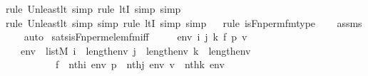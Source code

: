 \begin{isabellebody}
{\isacharparenleft}{\kern0pt}rule\ Un{\isacharunderscore}{\kern0pt}least{\isacharunderscore}{\kern0pt}lt{\isacharcomma}{\kern0pt}\ simp{\isacharcomma}{\kern0pt}\ rule\ ltI{\isacharcomma}{\kern0pt}\ simp{\isacharcomma}{\kern0pt}\ simp{\isacharparenright}{\kern0pt}\isanewline
\ \ \ \isamarkupfalse%
{\isacharparenleft}{\kern0pt}rule\ Un{\isacharunderscore}{\kern0pt}least{\isacharunderscore}{\kern0pt}lt{\isacharcomma}{\kern0pt}\ simp{\isacharcomma}{\kern0pt}\ simp{\isacharcomma}{\kern0pt}\ rule\ ltI{\isacharcomma}{\kern0pt}\ simp{\isacharcomma}{\kern0pt}\ simp{\isacharparenright}{\kern0pt}\isanewline
\ \ \isamarkupfalse%
{\isacharparenleft}{\kern0pt}rule\ is{\isacharunderscore}{\kern0pt}Fn{\isacharunderscore}{\kern0pt}perm{\isacharunderscore}{\kern0pt}fm{\isacharunderscore}{\kern0pt}type{\isacharparenright}{\kern0pt}\isanewline
\ \ \isamarkupfalse%
\ assms\isanewline
\ \ \isamarkupfalse%
\ auto%
\endisatagproof
{\isafoldproof}%
%
\isadelimproof
\isanewline
%
\endisadelimproof
\isanewline
{}\isamarkupfalse%
\ sats{\isacharunderscore}{\kern0pt}is{\isacharunderscore}{\kern0pt}Fn{\isacharunderscore}{\kern0pt}perm{\isacharprime}{\kern0pt}{\isacharunderscore}{\kern0pt}elem{\isacharunderscore}{\kern0pt}fm{\isacharunderscore}{\kern0pt}iff\ {\isacharcolon}{\kern0pt}\ \isanewline
\ \ \ env\ i\ j\ k\ f\ p\ v\ \isanewline
\ \ \ {\isachardoublequoteopen}env\ {\isasymin}\ list{\isacharparenleft}{\kern0pt}M{\isacharparenright}{\kern0pt}{\isachardoublequoteclose}\ {\isachardoublequoteopen}i\ {\isacharless}{\kern0pt}\ length{\isacharparenleft}{\kern0pt}env{\isacharparenright}{\kern0pt}{\isachardoublequoteclose}\ {\isachardoublequoteopen}j\ {\isacharless}{\kern0pt}\ length{\isacharparenleft}{\kern0pt}env{\isacharparenright}{\kern0pt}{\isachardoublequoteclose}\ {\isachardoublequoteopen}k\ {\isacharless}{\kern0pt}\ length{\isacharparenleft}{\kern0pt}env{\isacharparenright}{\kern0pt}{\isachardoublequoteclose}\ \isanewline
\ \ \ \ \ \ \ \ \ \ {\isachardoublequoteopen}f\ {\isacharequal}{\kern0pt}\ nth{\isacharparenleft}{\kern0pt}i{\isacharcomma}{\kern0pt}\ env{\isacharparenright}{\kern0pt}{\isachardoublequoteclose}\ {\isachardoublequoteopen}p\ {\isacharequal}{\kern0pt}\ nth{\isacharparenleft}{\kern0pt}j{\isacharcomma}{\kern0pt}\ env{\isacharparenright}{\kern0pt}{\isachardoublequoteclose}\ {\isachardoublequoteopen}v\ {\isacharequal}{\kern0pt}\ nth{\isacharparenleft}{\kern0pt}k{\isacharcomma}{\kern0pt}\ env{\isacharparenright}{\kern0pt}{\isachardoublequoteclose}\ \isanewline

\end{isabellebody}
